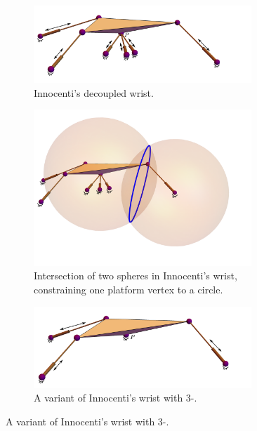 \documentclass[DD]{iitmdiss}
\begin{document}
\begin{figure}[h]
	\centering
	\begin{subfigure}{0.6\textwidth}
		\centering
		\includegraphics[width=0.9\textwidth]{iwrista.png}
		\caption{Innocenti's decoupled wrist.}
		\label{fg:iwrista}
	\end{subfigure}
	\begin{subfigure}{0.6\textwidth}
		\centering
		\includegraphics[width=0.9\textwidth]{iwristb.png}
		\caption{Intersection of two spheres in Innocenti's wrist, constraining one platform vertex to a circle.}
		\label{fg:iwristb}
	\end{subfigure}
	\begin{subfigure}{0.6\textwidth}
		\centering
		\includegraphics[width=0.9\textwidth]{iwristc.png}
		\caption{A variant of Innocenti's wrist with 3-\dofs.}
		\label{fg:iwristc}
	\end{subfigure}

\end{figure}
\end{document}
